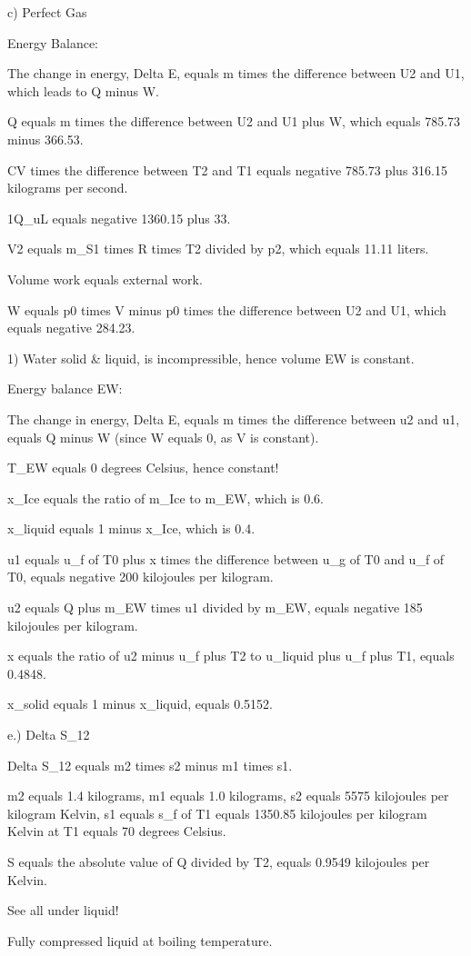 c) Perfect Gas

Energy Balance:

The change in energy, Delta E, equals m times the difference between U2 and U1, which leads to Q minus W.

Q equals m times the difference between U2 and U1 plus W, which equals 785.73 minus 366.53.

CV times the difference between T2 and T1 equals negative 785.73 plus 316.15 kilograms per second.

1Q_uL equals negative 1360.15 plus 33.

V2 equals m_S1 times R times T2 divided by p2, which equals 11.11 liters.

Volume work equals external work.

W equals p0 times V minus p0 times the difference between U2 and U1, which equals negative 284.23.

1) Water solid & liquid, is incompressible, hence volume EW is constant.

Energy balance EW:

The change in energy, Delta E, equals m times the difference between u2 and u1, equals Q minus W (since W equals 0, as V is constant).

T_EW equals 0 degrees Celsius, hence constant!

x_Ice equals the ratio of m_Ice to m_EW, which is 0.6.

x_liquid equals 1 minus x_Ice, which is 0.4.

u1 equals u_f of T0 plus x times the difference between u_g of T0 and u_f of T0, equals negative 200 kilojoules per kilogram.

u2 equals Q plus m_EW times u1 divided by m_EW, equals negative 185 kilojoules per kilogram.

x equals the ratio of u2 minus u_f plus T2 to u_liquid plus u_f plus T1, equals 0.4848.

x_solid equals 1 minus x_liquid, equals 0.5152.

e.) Delta S_12

Delta S_12 equals m2 times s2 minus m1 times s1.

m2 equals 1.4 kilograms,
m1 equals 1.0 kilograms,
s2 equals 5575 kilojoules per kilogram Kelvin,
s1 equals s_f of T1 equals 1350.85 kilojoules per kilogram Kelvin at T1 equals 70 degrees Celsius.

S equals the absolute value of Q divided by T2, equals 0.9549 kilojoules per Kelvin.

See all under liquid!

Fully compressed liquid at boiling temperature.